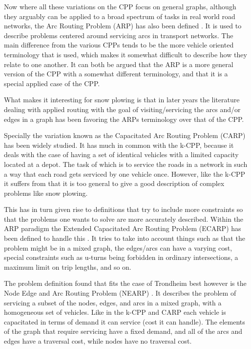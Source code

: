 Now where all these variations on the CPP focus on general graphs, although they arguably can be applied to a broad spectrum of tasks in real world road networks, the Arc Routing Problem (ARP) has also been defined \citep{eiselt1995ARP}. It is used to describe problems centered around servicing arcs in transport networks. The main difference from the various CPPs tends to be the more vehicle oriented terminology that is used, which makes it somewhat difficult to describe how they relate to one another. It can both be argued that the ARP is a more general version of the CPP with a somewhat different terminology, and that it is a special applied case of the CPP.

What makes it interesting for snow plowing is that in later years the literature dealing with applied routing with the goal of visiting/servicing the arcs and/or edges in a graph has been favoring the ARPs terminology over that of the CPP.

Specially the variation known as the Capacitated Arc Routing Problem (CARP) \citep{ulusoy1985CARP} has been widely studied. It has much in common with the k-CPP, because it deals with the case of having a set of identical vehicles with a limited capacity located at a depot. The task of which is to service the roads in a network in such a way that each road gets serviced by one vehicle once. However, like the k-CPP it suffers from that it is too general to give a good description of complex problems like snow plowing.

This has in turn given rise to definitions that try to include more constraints so that the problems one wants to solve are more accurately described. Within the ARP paradigm the Extended Capacitated Arc Routing Problem (ECARP) has been defined to handle this \citep{lacomme2004competitiveMA}. It tries to take into account things such as that the problem might be in a mixed graph, the edges/arcs can have a varying cost, special constraints such as u-turns being forbidden in ordinary intersections, a maximum limit on trip lengths, and so on.

The problem definition found that fits the case of Trondheim best however is the Node Edge and Arc Routing Problem (NEARP) \citep{prins2005memeticNEARP}. It describes the problem of servicing a subset of the nodes, edges, and arcs in a mixed graph, with a homogeneous set of vehicles. Like in the k-CPP and CARP each vehicle is capacitated in terms of demand it can service (cost it can handle). The elements of the graph that require servicing have a fixed demand, and all of the arcs and edges have a traversal cost, while nodes have no traversal cost.

